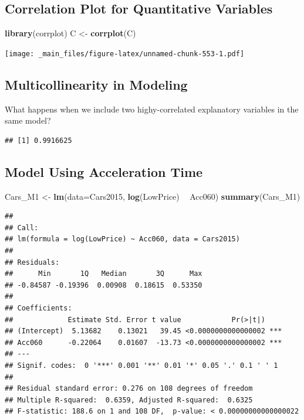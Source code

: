 \documentclass[]{book}
\newenvironment{Shaded}{\begin{snugshade}}{\end{snugshade}}
\newcommand{\KeywordTok}[1]{\textcolor[rgb]{0.13,0.29,0.53}{\textbf{#1}}}
\newcommand{\DataTypeTok}[1]{\textcolor[rgb]{0.13,0.29,0.53}{#1}}
\newcommand{\StringTok}[1]{\textcolor[rgb]{0.31,0.60,0.02}{#1}}
\newcommand{\OperatorTok}[1]{\textcolor[rgb]{0.81,0.36,0.00}{\textbf{#1}}}
\newcommand{\NormalTok}[1]{#1}
\begin{document}
\subsection{Correlation Plot for Quantitative
Variables}\label{correlation-plot-for-quantitative-variables}

\begin{Shaded}
\begin{Highlighting}[]
\KeywordTok{library}\NormalTok{(corrplot)}
\NormalTok{C <-}\StringTok{ }\KeywordTok{corrplot}\NormalTok{(C)}
\end{Highlighting}
\end{Shaded}

\texttt{[image: \_main\_files/figure-latex/unnamed-chunk-553-1.pdf]}

\subsection{Multicollinearity in
Modeling}\label{multicollinearity-in-modeling}

What happens when we include two highy-correlated explanatory variables
in the same model?

\begin{Shaded}
\end{Shaded}

\begin{verbatim}
## [1] 0.9916625
\end{verbatim}

\subsection{Model Using Acceleration
Time}\label{model-using-acceleration-time}

\begin{Shaded}
\begin{Highlighting}[]
\NormalTok{Cars_M1 <-}\StringTok{ }\KeywordTok{lm}\NormalTok{(}\DataTypeTok{data=}\NormalTok{Cars2015, }\KeywordTok{log}\NormalTok{(LowPrice) }\OperatorTok{~}\StringTok{ }\NormalTok{Acc060)}
\KeywordTok{summary}\NormalTok{(Cars_M1)}
\end{Highlighting}
\end{Shaded}

\begin{verbatim}
## 
## Call:
## lm(formula = log(LowPrice) ~ Acc060, data = Cars2015)
## 
## Residuals:
##      Min       1Q   Median       3Q      Max 
## -0.84587 -0.19396  0.00908  0.18615  0.53350 
## 
## Coefficients:
##             Estimate Std. Error t value            Pr(>|t|)    
## (Intercept)  5.13682    0.13021   39.45 <0.0000000000000002 ***
## Acc060      -0.22064    0.01607  -13.73 <0.0000000000000002 ***
## ---
## Signif. codes:  0 '***' 0.001 '**' 0.01 '*' 0.05 '.' 0.1 ' ' 1
## 
## Residual standard error: 0.276 on 108 degrees of freedom
## Multiple R-squared:  0.6359, Adjusted R-squared:  0.6325 
## F-statistic: 188.6 on 1 and 108 DF,  p-value: < 0.00000000000000022
\end{verbatim}
\end{document}
